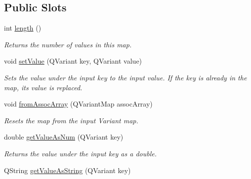 \subsection*{Public Slots}
\begin{DoxyCompactItemize}
\item 
\hypertarget{class_picto_1_1_analysis_variable_map_ae709418871687993b5afbe43f04eeff9}{int \hyperlink{class_picto_1_1_analysis_variable_map_ae709418871687993b5afbe43f04eeff9}{length} ()}\label{class_picto_1_1_analysis_variable_map_ae709418871687993b5afbe43f04eeff9}

\begin{DoxyCompactList}\small\item\em Returns the number of values in this map. \end{DoxyCompactList}\item 
\hypertarget{class_picto_1_1_analysis_variable_map_a5888155b938f4b7c37939a446de89293}{void \hyperlink{class_picto_1_1_analysis_variable_map_a5888155b938f4b7c37939a446de89293}{set\-Value} (Q\-Variant key, Q\-Variant value)}\label{class_picto_1_1_analysis_variable_map_a5888155b938f4b7c37939a446de89293}

\begin{DoxyCompactList}\small\item\em Sets the value under the input key to the input value. If the key is already in the map, its value is replaced. \end{DoxyCompactList}\item 
void \hyperlink{class_picto_1_1_analysis_variable_map_a314feed6ec4835f7c9e1b51377df7bb9}{from\-Assoc\-Array} (Q\-Variant\-Map assoc\-Array)
\begin{DoxyCompactList}\small\item\em Resets the map from the input Variant map. \end{DoxyCompactList}\item 
\hypertarget{class_picto_1_1_analysis_variable_map_adae2785504315f8061554fad9bb1623b}{double \hyperlink{class_picto_1_1_analysis_variable_map_adae2785504315f8061554fad9bb1623b}{get\-Value\-As\-Num} (Q\-Variant key)}\label{class_picto_1_1_analysis_variable_map_adae2785504315f8061554fad9bb1623b}

\begin{DoxyCompactList}\small\item\em Returns the value under the input key as a double. \end{DoxyCompactList}\item 
\hypertarget{class_picto_1_1_analysis_variable_map_aa25951114d55c7b34cb76d123ee1f750}{Q\-String \hyperlink{class_picto_1_1_analysis_variable_map_aa25951114d55c7b34cb76d123ee1f750}{get\-Value\-As\-String} (Q\-Variant key)}\label{class_picto_1_1_analysis_variable_map_aa25951114d55c7b34cb76d123ee1f750}


\end{DoxyCompactItemize}
